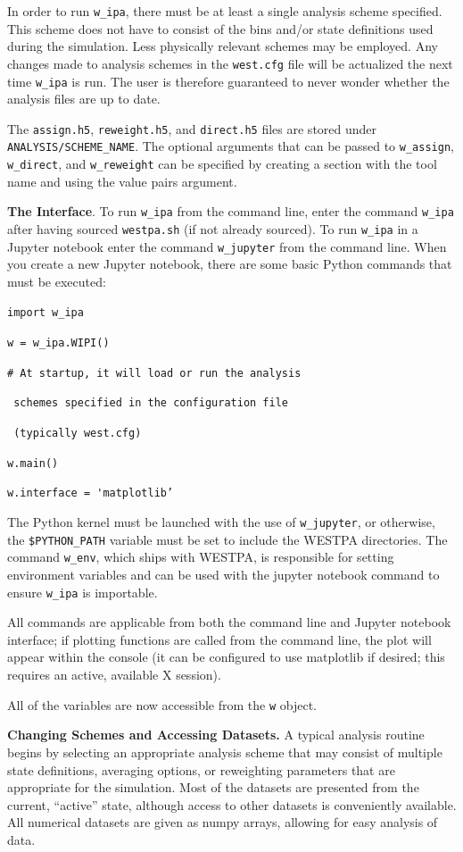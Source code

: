 \documentclass[9pt,tutorial]{livecoms}
\begin{document}
In order to run \verb|w_ipa|, there must be at least a single analysis scheme specified. 
This scheme does not have to consist of the bins and/or state definitions used during the simulation. 
Less physically relevant schemes may be employed. 
Any changes made to analysis schemes in the \verb|west.cfg| file will be actualized the next time \verb|w_ipa| is run. 
The user is therefore guaranteed to never wonder whether the analysis files are up to date. 

The \verb|assign.h5|, \verb|reweight.h5|, and \verb|direct.h5| files are stored under \verb|ANALYSIS/SCHEME_NAME|.
The optional arguments that can be passed to \verb|w_assign|, \verb|w_direct|, and \verb|w_reweight| can be specified by creating a section with the tool name and using the value pairs argument. 

\textbf{The Interface}. To run \verb|w_ipa| from the command line, enter the command \verb|w_ipa| after having sourced \verb|westpa.sh| (if not already sourced). 
To run \verb|w_ipa| in a Jupyter notebook enter the command \verb|w_jupyter| from the command line. 
When you create a new Jupyter notebook, there are some basic Python commands that must be executed:

\verb|import w_ipa|

\verb|w = w_ipa.WIPI()|

\verb|# At startup, it will load or run the analysis|

\verb| schemes specified in the configuration file|

\verb| (typically west.cfg)|

\verb|w.main()|

\verb|w.interface = 'matplotlib’|

The Python kernel must be launched with the use of \verb|w_jupyter|, or otherwise, the \verb|$PYTHON_PATH| variable must be set to include the WESTPA directories. 
The command \verb|w_env|, which ships with WESTPA, is responsible for setting environment variables and can be used with the jupyter notebook command to ensure \verb|w_ipa| is importable.

All commands are applicable from both the command line and Jupyter notebook interface; if plotting functions are called from the command line, the plot will appear within the console (it can be configured to use matplotlib if desired; this requires an active, available X session).

All of the variables are now accessible from the \verb|w| object.

\textbf{Changing Schemes and Accessing Datasets.} A typical analysis routine begins by selecting an appropriate analysis scheme that may consist of multiple state definitions, averaging options, or reweighting parameters that are appropriate for the simulation. 
Most of the datasets are presented from the current, “active” state, although access to other datasets is conveniently available. 
All numerical datasets are given as numpy arrays, allowing for easy analysis of data.
\end{document}
